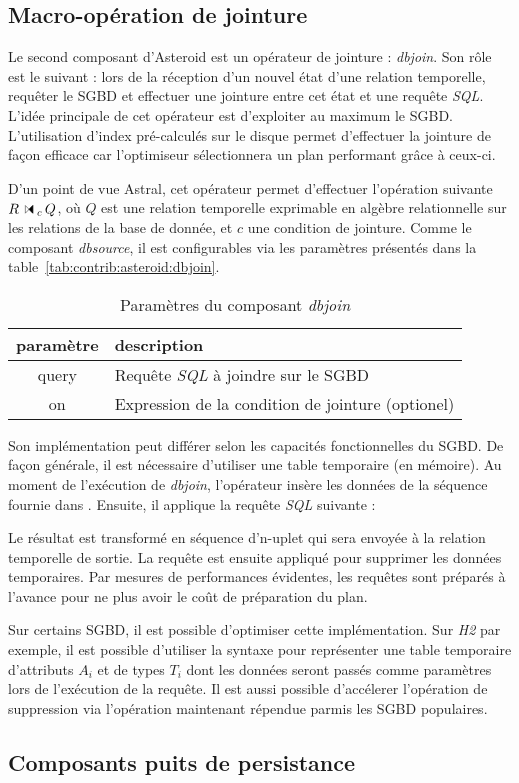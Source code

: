 \subsection{Macro-opération de jointure}
Le second composant d'Asteroid est un opérateur de jointure : \textit{dbjoin}. Son rôle est le suivant : lors de la réception d'un nouvel état d'une relation temporelle, requêter le SGBD et effectuer une jointure entre cet état et une requête \textit{SQL}. L'idée principale de cet opérateur est d'exploiter au maximum le SGBD. L'utilisation d'index pré-calculés sur le disque permet d'effectuer la jointure de façon efficace car l'optimiseur sélectionnera un plan performant grâce à ceux-ci.

D'un point de vue Astral, cet opérateur permet d'effectuer l'opération suivante $R \ssjoin_c Q$, où $Q$ est une relation temporelle exprimable en algèbre relationnelle sur les relations de la base de donnée, et $c$ une condition de jointure. Comme le composant \textit{dbsource}, il est configurables via les paramètres présentés dans la table~\ref{tab:contrib:asteroid:dbjoin}.
\begin{table}[ht]
    \centering
    \begin{tabular}{cl}
        paramètre & description \\ \midrule
        query & Requête \textit{SQL} à joindre sur le SGBD \\
        on & Expression de la condition de jointure (optionel)
    \end{tabular}
    \caption{Paramètres du composant \textit{dbjoin}}\label{tab:contrib:asteroid:dbsource}
\end{table}

Son implémentation peut différer selon les capacités fonctionnelles du SGBD. De façon générale, il est nécessaire d'utiliser une table temporaire  (en mémoire). Au moment de l'exécution de \textit{dbjoin}, l'opérateur insère les données de la séquence fournie dans . Ensuite, il applique la requête \textit{SQL} suivante : \begin{center}  \end{center}
Le résultat est transformé en séquence d'n-uplet qui sera envoyée à la relation temporelle de sortie. La requête  est ensuite appliqué pour supprimer les données temporaires. Par mesures de performances évidentes, les requêtes sont préparés à l'avance pour ne plus avoir le coût de préparation du plan.

Sur certains SGBD, il est possible d'optimiser cette implémentation. Sur \textit{H2} par exemple, il est possible d'utiliser la syntaxe  pour représenter une table temporaire d'attributs $A_i$ et de types $T_i$ dont les données seront passés comme paramètres lors de l'exécution de la requête. Il est aussi possible d'accélerer l'opération de suppression via l'opération  maintenant répendue parmis les SGBD populaires.

\subsection{Composants puits de persistance}
